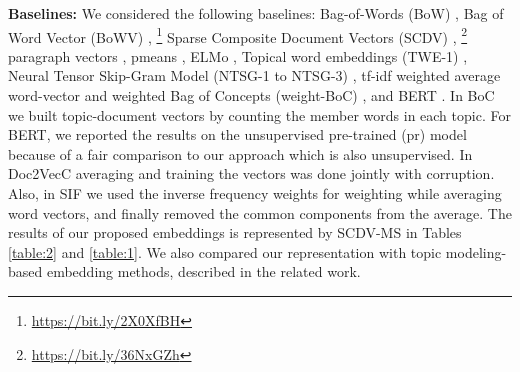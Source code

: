 \documentclass{ecai}
\begin{document}
\vspace{0.5em}
\noindent \textbf{Baselines: } We considered the following baselines: Bag-of-Words (BoW) \cite{harris54}, Bag of  Word Vector (BoWV) \cite{vivek}, \footnote{\url{https://bit.ly/2X0XfBH}} Sparse Composite Document Vectors (SCDV) \cite{mekala2017scdv}, \footnote{\url{https://bit.ly/36NxGZh}} paragraph vectors \cite{le2014distributed}, pmeans \cite{pmeans}, ELMo \cite{elmo}, Topical word  embeddings (TWE-1) \cite{AAAI159314}, Neural Tensor Skip-Gram Model (NTSG-1 to NTSG-3) \cite{liu2015learning}, tf-idf weighted average word-vector \cite{pranjal2015weighted} and weighted Bag of Concepts (weight-BoC)  \cite{boc}, and BERT \cite{devlin2018bert}. In BoC we built topic-document vectors by counting the member words in each topic. For BERT, we reported the results on the unsupervised pre-trained (pr) model because of a fair comparison to our approach which is also unsupervised.  In Doc2VecC \cite{chen2017efficient} averaging and training the vectors was done jointly with corruption. Also, in SIF \cite{arora2016simple} we used the inverse frequency weights for weighting while averaging word vectors, and finally removed the common components from the average. The results of our proposed embeddings is represented by SCDV-MS in Tables \ref{table:2} and \ref{table:1}. We also compared our representation with topic modeling-based embedding methods, described in the related work.
\end{document}
